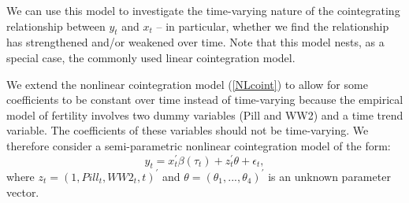 \documentclass[12pt,a4paper]{article}
\begin{document}
We can use this model to investigate the time-varying nature of the
cointegrating relationship between $y_{t}$ and $x_{t}$ -- in particular, whether we find the relationship has strengthened and/or weakened over time. Note that this model nests, as a special case, the commonly used linear cointegration model.  

We extend the nonlinear cointegration model (\ref{NLcoint}) to allow for
some coefficients to be constant over time instead of time-varying because
the empirical model of fertility involves two dummy variables (Pill and WW2) and a time trend variable.
The coefficients of these variables should not be time-varying. We therefore consider a semi-parametric nonlinear cointegration model of the form:%
\begin{equation}
y_{t}=x_{t}^{\prime }\beta \left( \tau _{t}\right) +z_{t}^{\prime }\theta+\epsilon _{t},  \label{semiPar}
\end{equation}%
where $z_{t}=\left( 1,Pill_{t},WW2_{t},t\right)^{\prime }$ and $\theta=\left(\theta_{1},...,\theta_{4}\right)^{\prime } $ is
an unknown parameter vector. 
\end{document}
